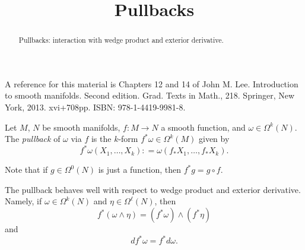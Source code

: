 \documentclass{ximera}
\title{Pullbacks}
\begin{document}
    \begin{abstract} Pullbacks: interaction with  wedge product and exterior derivative.    \end{abstract}
    \maketitle

    A reference for this material is Chapters 12 and  14 of John M. Lee. Introduction to smooth manifolds. Second edition. Grad. Texts in Math., 218. Springer, New York, 2013. xvi+708pp. ISBN: 978-1-4419-9981-8.

    \begin{definition}[Pullbacks]
        Let $M$, $N$ be smooth manifolds, $f : M \to N$ a smooth function, and $\omega \in \Omega ^k (N)$. The \emph{pullback} of $\omega$ via $f$ is the $k $-form $f^{\ast} \omega \in \Omega ^{k}(M)$ given by 
        \[  f^{\ast} \omega (X_1, \ldots , X_k) : = \omega (  f_{\ast} X_1, \ldots , f_{\ast} X_k  ).          \]
    \end{definition}

    Note that if $g \in \Omega ^0 (N)$ is just a function, then $f^{\ast} g = g \circ f$.

    \begin{proposition}
        The pullback behaves well with respect to wedge product and exterior derivative. Namely, if $\omega \in \Omega ^k (N)$ and $\eta \in \Omega ^{\ell}(N)$, then
        \[    f^{\ast} (\omega \wedge \eta ) = (f^{\ast} \omega ) \wedge (f^{\ast} \eta)                \]
        and 
        \[    d f^{\ast} \omega = f^{\ast } d \omega    .      \]
    \end{proposition}
\end{document}
